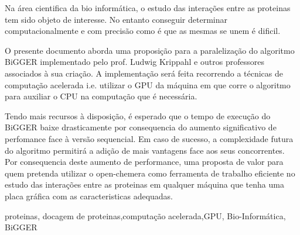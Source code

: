 


%
%
Na área cientifica da bio informática, o estudo das interações entre as proteinas tem sido objeto de interesse. 
No entanto conseguir determinar computacionalmente e com precisão como é que as mesmas se unem é dificil. %

O presente documento aborda uma proposição para a paralelização do algoritmo BiGGER implementado pelo prof. Ludwig Krippahl e outros professores associados à sua criação.
 A implementação será feita recorrendo a técnicas de computação acelerada i.e. utilizar o GPU da máquina em que corre o algoritmo para auxiliar o CPU na computação que é necessária. 
 
 Tendo mais recursos à disposição, é esperado que o tempo de execução do BiGGER baixe drasticamente por consequencia do aumento significativo de perfomance face à versão sequencial.
Em caso de sucesso, a complexidade futura do algoritmo permitirá a adição de mais vantagens face aos seus concorrentes.
Por consequencia deste aumento de performance, uma proposta de valor para quem pretenda utilizar o open-chemera como ferramenta de trabalho eficiente no estudo das interações entre as proteinas em qualquer máquina que tenha uma placa gráfica com as caracteristicas adequadas.
%
%
%


\begin{keywords}
proteinas, docagem de proteinas,computação acelerada,GPU, Bio-Informática, BiGGER
\end{keywords}
